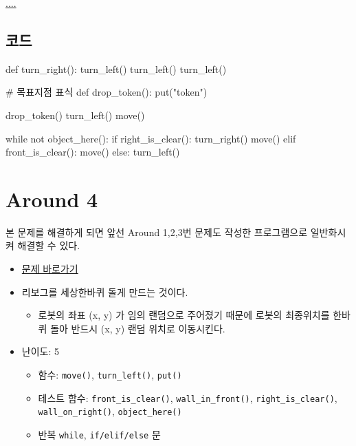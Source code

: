 \documentclass[
  b5paperpaper,
  DIV=11,
  numbers=noendperiod]{scrreprt}
\newenvironment{Shaded}{\begin{snugshade}}{\end{snugshade}}
\newcommand{\CommentTok}[1]{\textcolor[rgb]{0.37,0.37,0.37}{#1}}
\newcommand{\ControlFlowTok}[1]{\textcolor[rgb]{0.00,0.23,0.31}{#1}}
\newcommand{\KeywordTok}[1]{\textcolor[rgb]{0.00,0.23,0.31}{#1}}
\newcommand{\NormalTok}[1]{\textcolor[rgb]{0.00,0.23,0.31}{#1}}
\newcommand{\StringTok}[1]{\textcolor[rgb]{0.13,0.47,0.30}{#1}}
\providecommand{\tightlist}{%
  \setlength{\itemsep}{0pt}\setlength{\parskip}{0pt}}\usepackage{longtable,booktabs,array}
\begin{document}
\url{....}

\hypertarget{uxcf54uxb4dc-7}{%
\subsection{코드}\label{uxcf54uxb4dc-7}}

\begin{Shaded}
\begin{Highlighting}[]
\KeywordTok{def}\NormalTok{ turn\_right():}
\NormalTok{    turn\_left()}
\NormalTok{    turn\_left()}
\NormalTok{    turn\_left()}

\CommentTok{\# 목표지점 표식    }
\KeywordTok{def}\NormalTok{ drop\_token():}
\NormalTok{    put(}\StringTok{"token"}\NormalTok{)}

\NormalTok{drop\_token()}
\NormalTok{turn\_left()}
\NormalTok{move()}

\ControlFlowTok{while} \KeywordTok{not}\NormalTok{ object\_here():}
    \ControlFlowTok{if}\NormalTok{ right\_is\_clear():}
\NormalTok{        turn\_right()}
\NormalTok{        move()}
    \ControlFlowTok{elif}\NormalTok{ front\_is\_clear():}
\NormalTok{        move()}
    \ControlFlowTok{else}\NormalTok{:}
\NormalTok{        turn\_left()}
\end{Highlighting}
\end{Shaded}

\hypertarget{around-04}{%
\section{Around 4}\label{around-04}}

본 문제를 해결하게 되면 앞선 Around 1,2,3번 문제도 작성한 프로그램으로
일반화시켜 해결할 수 있다.

\begin{itemize}
\tightlist
\item
  \href{https://reeborg.ca/reeborg.html?lang=ko-en\&mode=python\&menu=worlds\%2Fmenus\%2Freeborg_intro_en.json\&name=Around\%203\&url=worlds\%2Ftutorial_en\%2Faround3.json}{문제
  바로가기}
\item
  리보그를 세상한바퀴 돌게 만드는 것이다.

  \begin{itemize}
  \tightlist
  \item
    로봇의 좌표 (x, y) 가 임의 랜덤으로 주어졌기 때문에 로봇의
    최종위치를 한바퀴 돌아 반드시 (x, y) 랜덤 위치로 이동시킨다.
  \end{itemize}
\item
  난이도: 5

  \begin{itemize}
  \tightlist
  \item
    함수: \texttt{move()}, \texttt{turn\_left()}, \texttt{put()}
  \item
    테스트 함수: \texttt{front\_is\_clear()},
    \texttt{wall\_in\_front()}, \texttt{right\_is\_clear()},
    \texttt{wall\_on\_right()}, \texttt{object\_here()}
  \item
    반복 \texttt{while}, \texttt{if/elif/else} 문
  \end{itemize}
\end{itemize}
\end{document}
